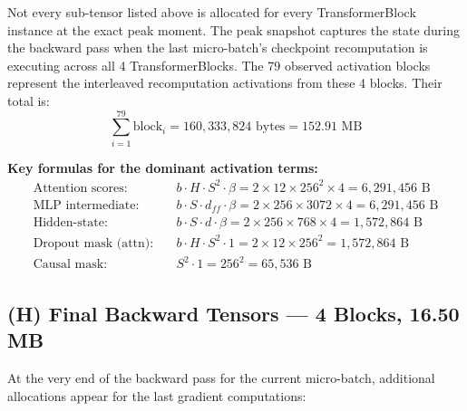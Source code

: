 \documentclass[11pt,a4paper]{article}
\begin{document}
\noindent Not every sub-tensor listed above is allocated for every TransformerBlock instance at the exact peak moment. The peak snapshot captures the state during the backward pass when the last micro-batch's checkpoint recomputation is executing across all 4 TransformerBlocks. The 79 observed activation blocks represent the interleaved recomputation activations from these 4 blocks. Their total is:
\begin{equation}
  \sum_{i=1}^{79} \text{block}_i = 160{,}333{,}824 \text{~bytes} = 152.91 \text{~MB}
\end{equation}

\noindent\textbf{Key formulas for the dominant activation terms:}
\begin{align}
  \text{Attention scores:}\quad & b \cdot H \cdot S^2 \cdot \beta = 2 \times 12 \times 256^2 \times 4 = 6{,}291{,}456 \text{~B} \label{eq:attn_scores} \\
  \text{MLP intermediate:}\quad & b \cdot S \cdot d_{ff} \cdot \beta = 2 \times 256 \times 3072 \times 4 = 6{,}291{,}456 \text{~B} \label{eq:mlp_inter} \\
  \text{Hidden-state:}\quad & b \cdot S \cdot d \cdot \beta = 2 \times 256 \times 768 \times 4 = 1{,}572{,}864 \text{~B} \label{eq:hidden} \\
  \text{Dropout mask (attn):}\quad & b \cdot H \cdot S^2 \cdot 1 = 2 \times 12 \times 256^2 = 1{,}572{,}864 \text{~B} \label{eq:drop_attn} \\
  \text{Causal mask:}\quad & S^2 \cdot 1 = 256^2 = 65{,}536 \text{~B} \label{eq:causal}
\end{align}

\subsection{(H) Final Backward Tensors --- 4 Blocks, 16.50\,MB}
\label{sec:final_bwd}

At the very end of the backward pass for the current micro-batch, additional allocations appear for the last gradient computations:
\end{document}

